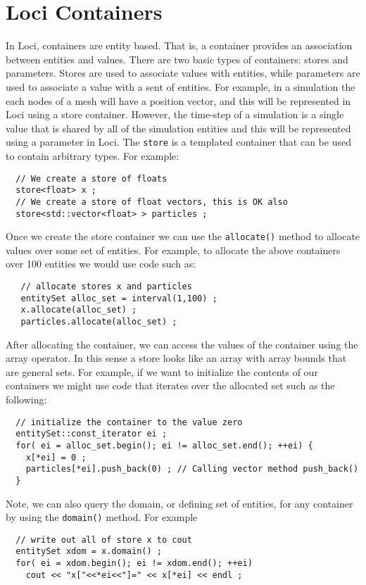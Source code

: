 \documentclass[10pt,epsf]{book}
\begin{document}


\section{Loci Containers}

In Loci, containers are entity based.  That is, a container provides
an association between entities and values.  There are two basic types
of containers: stores and parameters.  Stores are used to associate
values with entities, while parameters are used to associate a value
with a sent of entities.  For example, in a simulation the each nodes
of a mesh will have a position vector, and this will be represented in
Loci using a store container.  However, the time-step of a simulation
is a single value that is shared by all of the simulation entities and
this will be represented using a parameter in Loci.  The {\tt store} is a
templated container that can be used to contain arbitrary types.  For
example:
\begin{verbatim}
  // We create a store of floats
  store<float> x ;
  // We create a store of float vectors, this is OK also
  store<std::vector<float> > particles ;
\end{verbatim}

Once we create the store container we can use the {\tt allocate()}
method to allocate values over some set of entities.  For example, to
allocate the above containers over 100 entities we would use code such
as:
\begin{verbatim}
   // allocate stores x and particles
   entitySet alloc_set = interval(1,100) ;
   x.allocate(alloc_set) ;
   particles.allocate(alloc_set) ;
\end{verbatim}

After allocating the container, we can access the values of the
container using the array operator.  In this sense a store looks like
an array with array bounds that are general sets.  For example, if we
want to initialize the contents of our containers we might use code
that iterates over the allocated set such as the following:
\begin{verbatim}
  // initialize the container to the value zero
  entitySet::const_iterator ei ;
  for( ei = alloc_set.begin(); ei != alloc_set.end(); ++ei) {
    x[*ei] = 0 ;
    particles[*ei].push_back(0) ; // Calling vector method push_back()
  }
\end{verbatim}

Note, we can also query the domain, or defining set of entities, for any container by using the {\tt domain()} method.  For example
\begin{verbatim}
  // write out all of store x to cout
  entitySet xdom = x.domain() ;
  for( ei = xdom.begin(); ei != xdom.end(); ++ei) 
    cout << "x["<<*ei<<"]=" << x[*ei] << endl ;
\end{verbatim}
\end{document}
